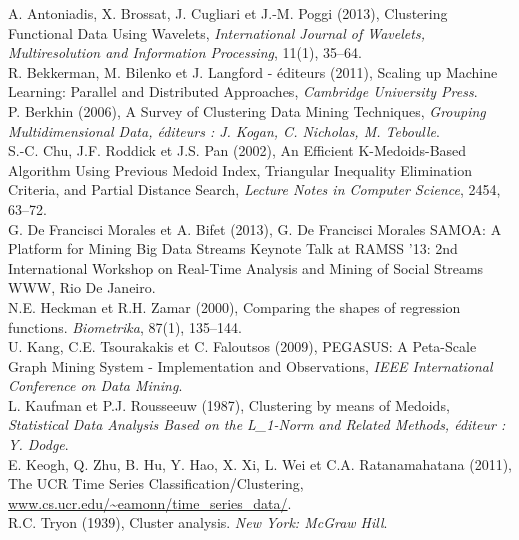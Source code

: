\documentclass[12pt]{article}
\begin{document}
\noindent [1] A. Antoniadis, X. Brossat, J. Cugliari et J.-M. Poggi (2013), Clustering Functional Data Using Wavelets, {\it International Journal of Wavelets, Multiresolution and Information Processing}, 11(1), 35--64.\\
\noindent [2] R. Bekkerman, M. Bilenko et J. Langford - éditeurs (2011), Scaling up Machine Learning: Parallel and Distributed Approaches, {\it Cambridge University Press}.\\
\noindent [3] P. Berkhin (2006), A Survey of Clustering Data Mining Techniques, {\it Grouping Multidimensional Data, éditeurs : J. Kogan, C. Nicholas, M. Teboulle}.\\
\noindent [4] S.-C. Chu, J.F. Roddick et J.S. Pan (2002), An Efficient K-Medoids-Based Algorithm Using Previous Medoid Index, Triangular Inequality Elimination Criteria, and Partial Distance Search, {\it Lecture Notes in Computer Science}, 2454, 63--72.\\
\noindent [5] G. De Francisci Morales et A. Bifet (2013), G. De Francisci Morales SAMOA: A Platform for Mining Big Data Streams Keynote Talk at RAMSS ’13: 2nd International Workshop on Real-Time Analysis and Mining of Social Streams WWW, Rio De Janeiro.\\
\noindent [6] N.E. Heckman et R.H. Zamar (2000), Comparing the shapes of regression functions. {\it Biometrika}, 87(1), 135--144.\\
\noindent [7] U. Kang, C.E. Tsourakakis et C. Faloutsos (2009), PEGASUS: A Peta-Scale Graph Mining System - Implementation and Observations, {\it IEEE International Conference on Data Mining}.\\
\noindent [8] L. Kaufman et P.J. Rousseeuw (1987), Clustering by means of Medoids, {\it Statistical Data Analysis Based on the L\_1-Norm and Related Methods, éditeur : Y. Dodge}.\\
\noindent [9] E. Keogh, Q. Zhu, B. Hu, Y. Hao, X. Xi, L. Wei et C.A. Ratanamahatana (2011), The UCR Time Series Classification/Clustering, \url{ www.cs.ucr.edu/\~eamonn/time\_series\_data/}.\\
\noindent [10] R.C. Tryon (1939), Cluster analysis. {\it New York: McGraw Hill}.\\
\end{document}
